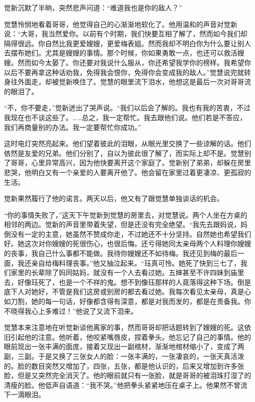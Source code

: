 \par 觉新沉默了半晌，突然悲声问道：“难道我也是你的敌人？”
\par 觉慧怜悯地看着哥哥，他觉得自己的心渐渐地软化了。他用温和的声音对觉新说：“大哥，我当然爱你。以前有个时期，我们快要互相了解了，然而如今我们却隔得很远。你自然比我更爱嫂嫂，更爱梅表姐。然而我却不明白你为什么要让别人去摆布她们。尤其是嫂嫂的事情。那个时候，你如果勇敢一点，也还可以救活嫂嫂。然而如今太晏了。你还要对我说什么服从，你还希望我学你的榜样。我希望你以后不要再拿这种话劝我，免得我会恨你，免得你会变成我的敌人。”觉慧说完就转身往外面走，却被觉新唤住了。觉慧的眼里流下泪水，他想这是最后一次对哥哥流的眼泪了。
\par “不，你不要走，”觉新迸出了哭声说。“我们以后会了解的。我也有我的苦衷，不过我现在也不谈这些了。……总之，我一定帮忙。我去跟他们说。他们若是不答应，我们再商量别的办法。我一定要帮忙你成功。”
\par 这时电灯突然亮起来。他们望着彼此的泪眼，从眼光里交换了一些谅解的话。他们依然是友爱的兄弟。他们分别了，自以为彼此很了解了，而实际上却不是。觉慧别了哥哥，心里异常高兴，因为他快要离开这个家庭了。觉新别了弟弟，却躲在房里悲哭，他明白又有一个亲爱的人要离开他了。他会留在家里过着更凄凉、更孤寂的生活。
\par 觉新果然履行了他的诺言。两天以后，他又有了跟觉慧单独谈话的机会。
\par “你的事情失败了，”这天下午觉新到觉慧的房里去，对觉慧说。两个人坐在方桌的相邻的两边。觉新的声音里带着失望，但是还没有完全绝望。“我先去跟妈说，妈倒没有一定的主意，她虽然不赞成你走，不过她还不十分坚持。自然她也希望我们好。她这次对你嫂嫂的死很伤心，也很后悔。还亏得她同太亲母两个人料理你嫂嫂的丧事，我自己什么事都不能做。我待你嫂嫂还不如待梅。我还见到梅的最后一面，我还亲自给梅料理丧事。”他又抽泣起来。“珏真可怜。她死了快到三七了，我们家里的长辈除了妈同姑妈，就没有一个人去看过她。五婶甚至不许四妹到庙里去，好像珏死了，也是一个不祥的鬼。想不到像珏那样的人竟落得这种下场。倒是底下人对她好，不管是我们这房或别房的都去看过她。我每次看见太亲母，真是心如刀割，她的每一句话，好像都含得有深意，都是对我而发的，都是在责备我。你不晓得我心上多难过！”他说了又流下泪来。
\par 觉慧本来注意地在听觉新谈他离家的事，然而哥哥却把话题转到了嫂嫂的死。这依旧引起他的注意。他听着，他咬紧嘴唇皮，捏着拳头。他忘记了自己的事情。他的眼前现出一张丰满的面庞，接着又现出一副棺材，渐渐地棺材缩小了，变成了两副，三副。于是又换了三张女人的脸：一张丰满的，一张凄哀的，一张天真活泼的。脸的数目突然又增加了，四张，五张，都是他认识的，后来又增加到许多张脸，但是又突然完全消灭了。他的眼前就只有一张脸，就是哥哥的被泪珠打湿了的清瘦的脸。他低声自语道：“我不哭。”他把拳头紧紧地压在桌子上。他果然不曾流下一滴眼泪。
